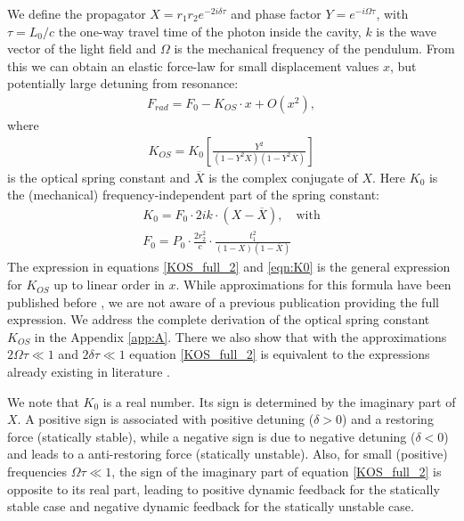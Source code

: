 \documentclass[%
 reprint,
 amsmath,amssymb,
 aps,
]{revtex4-1}
\begin{document}
We define the propagator $X=r_1r_2e^{-2i\delta\tau}$ and phase factor $Y=e^{-i\Omega\tau}$, with $\tau=L_0/c$ the one-way
travel time of the photon inside the cavity, $k$ is the wave vector of the light field  and $\Omega$ 
is the mechanical frequency of the pendulum. From this we can obtain an elastic force-law for small displacement values $x$, but potentially large detuning from resonance:
\begin{eqnarray}
\label{eqn:Frd}
F_{rad}=F_0-K_{OS}\cdot x + O(x^2),
\end{eqnarray}
where
\begin{eqnarray}
\label{KOS_full_2}
K_{OS}=K_0\left [ \frac{Y^2}{(1-Y^2X)(1-Y^2\overline{X})}  \right ]
\end{eqnarray}
is the optical spring constant and $\overline{X}$ is the complex conjugate of $X$. Here $K_0$ is the 
(mechanical) frequency-independent part of the spring constant:
\begin{eqnarray}
\label{eqn:K0}
K_0=F_0 \cdot 2 i k \cdot (X-\overline{X}),   \quad \mbox{with}\nonumber\\ 
F_0 = P_0 \cdot \frac{2  r_2^2}{c} \cdot \frac{t_1^2}{(1-X)(1-\overline{X})}
\end{eqnarray}
The expression in equations \ref{KOS_full_2} and \ref{eqn:K0}
is the general expression for $K_{OS}$ up to linear order in $x$. While approximations for this formula have been published before \cite{Barginsky02}, we are not aware of a previous publication providing the full expression.
We address the complete derivation of the optical spring constant $K_{OS}$ in the Appendix \ref{app:A}. There we also show that with the approximations $2\Omega\tau\ll1$ and $2\delta\tau\ll1$  equation \ref{KOS_full_2} is equivalent to the expressions already existing in literature \cite{Barginsky02,Corbitt07}. 

We note that $K_0$ is a real number. Its sign is determined by the imaginary part of $X$. A positive sign is associated with positive detuning ($\delta>0$) and a restoring force (statically stable),  while a negative sign is due to  negative detuning ($\delta<0$) and
leads to a anti-restoring force  (statically unstable).  Also, for small (positive) frequencies $\Omega\tau\ll1$, the sign of the imaginary part of equation \ref{KOS_full_2} is opposite to its real part, leading to positive dynamic feedback for the statically stable case and  negative dynamic feedback for the statically unstable case.
\end{document}
